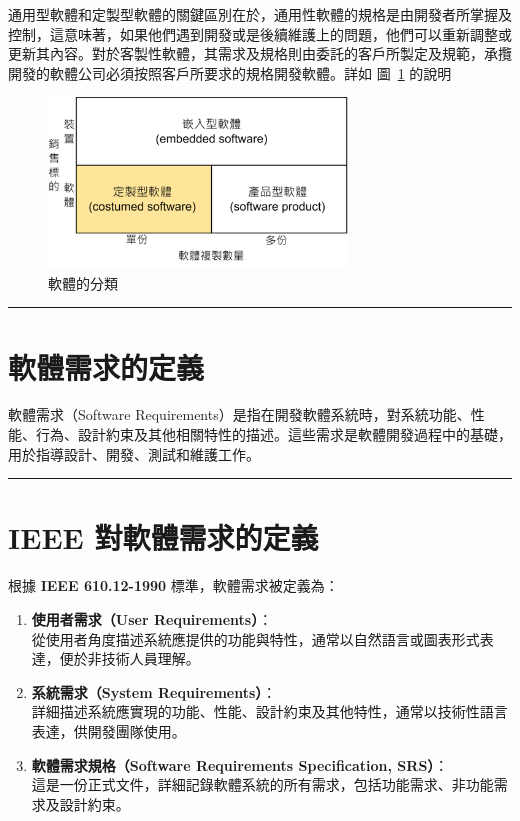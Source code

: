 \documentclass[
  letterpaper,
  oneside,
  open=any]{scrbook}
\begin{document}
通用型軟體和定製型軟體的關鍵區別在於，通用性軟體的規格是由開發者所掌握及控制，這意味著，如果他們遇到開發或是後續維護上的問題，他們可以重新調整或更新其內容。對於客製性軟體，其需求及規格則由委託的客戶所製定及規範，承攬開發的軟體公司必須按照客戶所要求的規格開發軟體。詳如
圖~\ref{fig-sw-category} 的說明

\begin{figure}

\includegraphics[width=3.125in,height=\textheight,keepaspectratio]{content/../images/sw-category.png}

\caption{\label{fig-sw-category}軟體的分類}

\end{figure}%

\begin{center}\rule{0.5\linewidth}{0.5pt}\end{center}

\section{軟體需求的定義}\label{ux8edfux9ad4ux9700ux6c42ux7684ux5b9aux7fa9}

軟體需求（Software
Requirements）是指在開發軟體系統時，對系統功能、性能、行為、設計約束及其他相關特性的描述。這些需求是軟體開發過程中的基礎，用於指導設計、開發、測試和維護工作。

\begin{center}\rule{0.5\linewidth}{0.5pt}\end{center}

\section{IEEE
對軟體需求的定義}\label{ieee-ux5c0dux8edfux9ad4ux9700ux6c42ux7684ux5b9aux7fa9}

根據 \textbf{IEEE 610.12-1990} 標準，軟體需求被定義為：

\begin{enumerate}
\def\labelenumi{\arabic{enumi}.}
\item
  \textbf{使用者需求（User Requirements）}：\\
  從使用者角度描述系統應提供的功能與特性，通常以自然語言或圖表形式表達，便於非技術人員理解。
\item
  \textbf{系統需求（System Requirements）}：\\
  詳細描述系統應實現的功能、性能、設計約束及其他特性，通常以技術性語言表達，供開發團隊使用。
\item
  \textbf{軟體需求規格（Software Requirements Specification, SRS）}：\\
  這是一份正式文件，詳細記錄軟體系統的所有需求，包括功能需求、非功能需求及設計約束。
\end{enumerate}
\end{document}
